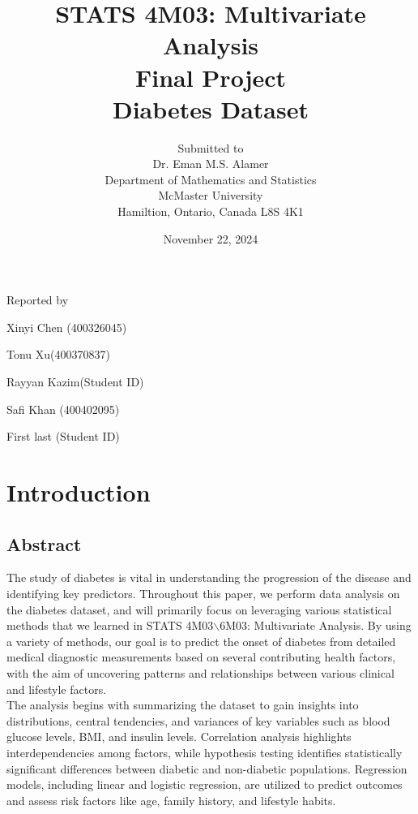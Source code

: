 \documentclass[12pt]{article}
\begin{document}
\title{STATS 4M03: Multivariate Analysis\\ Final Project \\ Diabetes Dataset }

\author{Submitted to\\ Dr. Eman M.S. Alamer 
\\Department of Mathematics and Statistics
\\McMaster University\\Hamiltion, Ontario, Canada L8S 4K1}
\date {November 22, 2024}


\maketitle

 \centerline{Reported by}
 \centerline{Xinyi Chen (400326045)}
  \centerline{Tonu Xu(400370837)}
   \centerline{Rayyan Kazim(Student ID)}
    \centerline{Safi Khan (400402095)}
     \centerline{First last (Student ID)}


\newpage
\section{Introduction}
\subsection{Abstract}

The study of diabetes is vital in understanding the progression of the disease and identifying key predictors. Throughout this paper, we perform data analysis on the diabetes dataset, and will primarily focus on leveraging various statistical methods that we learned in STATS 4M03$\backslash$6M03: Multivariate Analysis. By using a variety of methods, our goal is to predict the onset of diabetes from detailed medical diagnostic measurements based on several contributing health factors, with the aim of uncovering patterns and relationships between various clinical and lifestyle factors. \\



The analysis begins with summarizing the dataset to gain insights into distributions, central tendencies, and variances of key variables such as blood glucose levels, BMI, and insulin levels. Correlation analysis highlights interdependencies among factors, while hypothesis testing identifies statistically significant differences between diabetic and non-diabetic populations. Regression models, including linear and logistic regression, are utilized to predict outcomes and assess risk factors like age, family history, and lifestyle habits.
\end{document}
